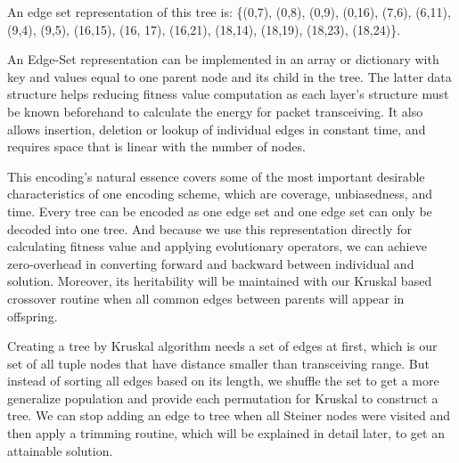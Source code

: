 \noindent{}

	An edge set representation of this tree is: \{(0,7), (0,8), (0,9), (0,16), (7,6), (6,11), (9,4), (9,5), (16,15), (16, 17), (16,21), (18,14), (18,19), (18,23), (18,24)\}.

	An Edge-Set representation can be implemented in an array or dictionary with key and values equal to one parent node and its child in the tree. The latter data structure helps reducing fitness value computation as each layer’s structure must be known beforehand to calculate the energy for packet transceiving. It also allows insertion, deletion or lookup of individual edges in constant time, and requires space that is linear with the number of nodes.

	This encoding’s natural essence covers some of the most important desirable characteristics of one encoding scheme, which are coverage, unbiasedness, and time. Every tree can be encoded as one edge set and one edge set can only be decoded into one tree. And because we use this representation directly for calculating fitness value and applying evolutionary operators, we can achieve zero-overhead in converting forward and backward between individual and solution. Moreover, its heritability will be maintained with our Kruskal based crossover routine when all common edges between parents will appear in offspring.

	Creating a tree by Kruskal algorithm needs a set of edges at first, which is our set of all tuple nodes that have distance smaller than transceiving range. But instead of sorting all edges based on its length, we shuffle the set to get a more generalize population and provide each permutation for Kruskal to construct a tree. We can stop adding an edge to tree when all Steiner nodes were visited and then apply a trimming routine, which will be explained in detail later, to get an attainable solution.

